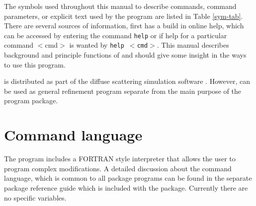 The symbols used throughout this manual to describe commands,
command parameters, or explicit text used by the program \Refine     
are listed in Table \ref{sym-tab}. There are several sources
of information, first \Refine  has a build in online help, which
can be accessed by entering the command {\tt help} or if help for a
particular command $<$cmd$>$ is wanted by {\tt help $<$cmd$>$}. This
manual describes background and principle functions of \Refine
and should give some insight in the ways to use this program. \par

\Refine is distributed as part of the diffuse scattering
simulation software \discus.  However, \Refine can be used
as general refinement program separate from the main purpose of 
the \Discus program package. 


\section{Command language}


The program includes a FORTRAN style interpreter that allows the
user to program complex modifications. A detailed discussion about the 
command language, which is common to all \Discus package programs can be 
found in the separate \Discus package reference guide which is included with 
the package. Currently there are no \Refine specific variables.

